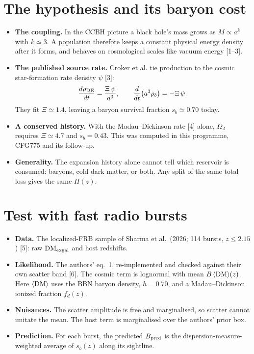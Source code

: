 \documentclass[10pt]{article}
\begin{document}
\section{The hypothesis and its baryon cost}
\begin{itemize}
\item \textbf{The coupling.} In the CCBH picture a black hole's mass grows as $M\propto a^{k}$ with $k\simeq3$. A population therefore keeps a constant physical energy density after it forms, and behaves on cosmological scales like vacuum energy [1--3].
\item \textbf{The published source rate.} Croker et al. tie production to the cosmic star-formation rate density $\psi$ [3]:
$$\frac{d\rho_{\rm DE}}{dt}=\frac{\Xi\,\psi}{a^{3}},\qquad \frac{d}{dt}\big(a^{3}\rho_b\big)=-\Xi\,\psi .$$
They fit $\Xi\simeq1.4$, leaving a baryon survival fraction $s_b\simeq0.70$ today.
\item \textbf{A conserved history.} With the Madau--Dickinson rate [4] alone, $\Omega_\Lambda$ requires $\Xi\simeq4.7$ and $s_b=0.43$. This was computed in this programme, CFG775 and its follow-up.
\item \textbf{Generality.} The expansion history alone cannot tell which reservoir is consumed: baryons, cold dark matter, or both. Any split of the same total loss gives the same $H(z)$.
\end{itemize}

\section{Test with fast radio bursts}
\begin{itemize}
\item \textbf{Data.} The localized-FRB sample of Sharma et al.\ (2026; 114 bursts, $z\le2.15$) [5]: raw $\mathrm{DM}_{\rm exgal}$ and host redshifts.
\item \textbf{Likelihood.} The authors' eq.~1, re-implemented and checked against their own scatter band [6]. The cosmic term is lognormal with mean $B\,\langle{\rm DM}\rangle(z)$. Here $\langle{\rm DM}\rangle$ uses the BBN baryon density, $h=0.70$, and a Madau--Dickinson ionized fraction $f_d(z)$.
\item \textbf{Nuisances.} The scatter amplitude is free and marginalised, so scatter cannot imitate the mean. The host term is marginalised over the authors' prior box.
\item \textbf{Prediction.} For each burst, the predicted $B_{\rm pred}$ is the dispersion-measure-weighted average of $s_b(z)$ along its sightline.
\end{itemize}
\end{document}
